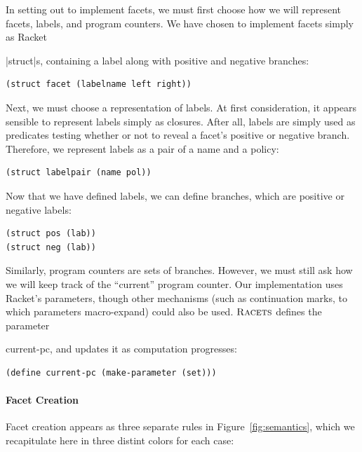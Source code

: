 \documentclass[review=true,acmlarge]{acmart}
\newcommand*{\SavedLstInline}{}
\DeclareRobustCommand*{\lstinline}{%
  \ifmmode
    \let\SavedBGroup\bgroup
    \def\bgroup{%
      \let\bgroup\SavedBGroup
      \hbox\bgroup
    }%
  \fi
  \SavedLstInline
}
\newcommand{\code}[1]{\lstinline{#1}}
\newcommand{\comm}[3][\color{red}]{{#1{[{#2}: {#3}]}}}
\newcommand{\kris}[1]{\comm[\color{blue}]{Kris}{#1}}
\newcommand{\racets}[0]{$\textsc{Racets}$\xspace}
\begin{document}
In setting out to implement facets, we must first choose how we will
represent facets, labels, and program counters. We have chosen to
implement facets simply as Racket \lstinline|struct|s, containing a
label along with positive and negative branches:

\begin{lstlisting}[language=Racket,escapechar=|,name=racets]
(struct facet (labelname left right))
\end{lstlisting}

Next, we must choose a representation of labels. At first
consideration, it appears sensible to represent labels simply as
closures. After all, labels are simply used as predicates testing
whether or not to reveal a facet's positive or negative
branch. Therefore, we represent labels as a pair of a name and a policy:

\begin{lstlisting}[language=Racket,escapechar=|,name=racets]
(struct labelpair (name pol))
\end{lstlisting}

Now that we have defined labels, we can define branches, which are
positive or negative labels:

\begin{lstlisting}[language=Racket,escapechar=|,name=racets]
(struct pos (lab))
(struct neg (lab))
\end{lstlisting}

Similarly, program counters are sets of branches. However, we must
still ask how we will keep track of the ``current'' program
counter. Our implementation uses Racket's parameters, though other
mechanisms (such as continuation marks\kris{cite}, to which parameters
macro-expand) could also be used. \racets defines the parameter
\code{current-pc}, and updates it as computation progresses:

\begin{lstlisting}[language=Racket,escapechar=|,name=racets]
(define current-pc (make-parameter (set)))
\end{lstlisting}

\paragraph*{Facet Creation}

Facet creation appears as three separate rules in
Figure~\ref{fig:semantics}, which we recapitulate here in three
distint colors for each case:
\end{document}
